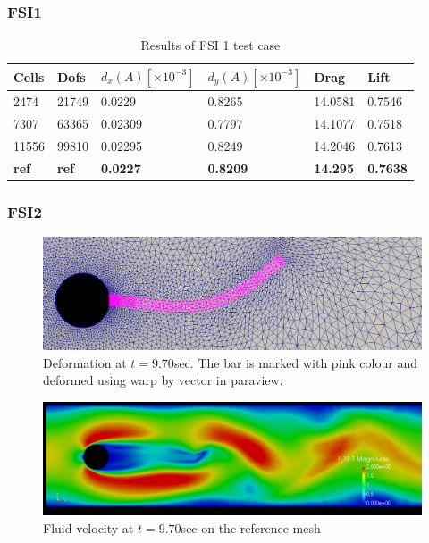 \subsubsection*{FSI1}
\begin{table}[H]
\centering
\caption{Results of FSI 1 test case}
\label{my-label}
\begin{tabular}{|l|l|l|l|l|l|}
\hline
Cells & Dofs & $d_x(A) [\times10^{-3}]$ & $d_y(A)[\times10^{-3}]$ & Drag & Lift \\ \hline
2474 & 21749 & 0.0229 & 0.8265 & 14.0581 & 0.7546 \\ \hline
7307 & 63365 & 0.02309 & 0.7797 & 14.1077 & 0.7518 \\ \hline
11556 & 99810 & 0.02295 & 0.8249 & 14.2046 & 0.7613 \\ \hline
\textbf{ref} & \textbf{ref} & \textbf{0.0227} & \textbf{0.8209} & \textbf{14.295} & \textbf{0.7638} \\ \hline
\end{tabular}
\end{table}

\subsubsection*{FSI2}

\begin{figure}[H]
\includegraphics[scale=0.35,trim={0mm 0mm 0mm 0mm},clip]{./Verification_Validation/Hron_Turek/FSI2_d_970.png}
\caption{Deformation at $t =9.70 $sec. The bar is marked with pink colour and deformed using warp by vector in paraview.}
\end{figure}
\begin{figure}[H]
\includegraphics[scale=0.35,trim={0mm 0mm 0mm 0mm},clip]{./Verification_Validation/Hron_Turek/FSI2_u_970.png}
\caption{Fluid velocity at $ t = 9.70 $sec on the reference mesh}
\end{figure}



